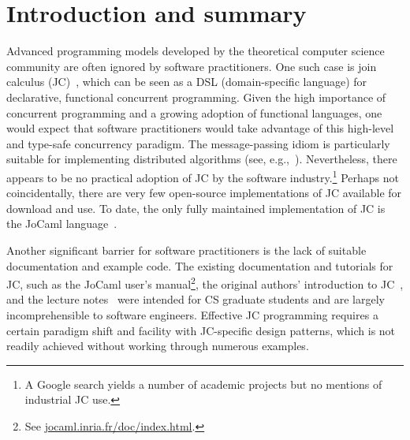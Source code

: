 \documentclass[sigplan,10pt,review,anonymous]{acmart}\settopmatter{printfolios=true}
\begin{document}


\maketitle


\section{Introduction and summary}

Advanced programming models developed by the theoretical computer
science community are often ignored by software practitioners. One
such case is join calculus (JC)~\citep{FouGon1996}, which can be
seen as a DSL (domain-specific language) for declarative, functional
concurrent programming. Given the high importance of concurrent programming
and a growing adoption of functional languages, one would expect that
software practitioners would take advantage of this high-level and
type-safe concurrency paradigm. The message-passing idiom is particularly
suitable for implementing distributed algorithms (see, e.g.,~\citep{BarEA2007}).
Nevertheless, there appears to be no practical adoption of JC by the
software industry.\footnote{ A Google search yields a number of academic projects but no mentions
of industrial JC use.} Perhaps not coincidentally, there are very few open-source implementations
of JC available for download and use. To date, the only fully maintained
implementation of JC is the JoCaml language~\citep{FouEA2003}.

Another significant barrier for software practitioners is the lack
of suitable documentation and example code. The existing documentation
and tutorials for JC, such as the JoCaml user's manual\footnote{ See \href{http://jocaml.inria.fr/doc/index.html}{jocaml.inria.fr/doc/index.html}.},
the original authors' introduction to JC~\citep{FouGon2000}, and
the lecture notes~\citep{FouEA2003} were intended for CS graduate students
and are largely incomprehensible to software engineers.
Effective JC programming requires a certain paradigm shift and facility
with JC-specific design patterns, which is not readily achieved without
working through numerous examples.
\end{document}
